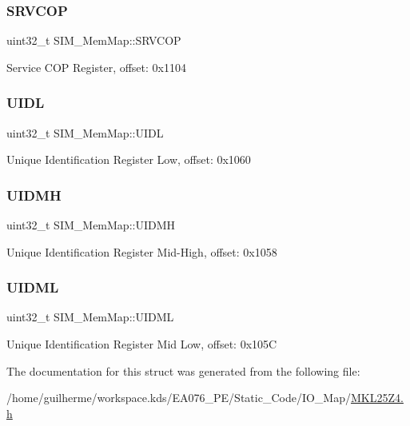 \subsubsection{\texorpdfstring{S\+R\+V\+C\+OP}{SRVCOP}}
{\footnotesize\ttfamily uint32\+\_\+t S\+I\+M\+\_\+\+Mem\+Map\+::\+S\+R\+V\+C\+OP}

Service C\+OP Register, offset\+: 0x1104 \mbox{\label{struct_s_i_m___mem_map_ac23a694afa8d84e55fc43ff0c0ec1b29}} 
\subsubsection{\texorpdfstring{U\+I\+DL}{UIDL}}
{\footnotesize\ttfamily uint32\+\_\+t S\+I\+M\+\_\+\+Mem\+Map\+::\+U\+I\+DL}

Unique Identification Register Low, offset\+: 0x1060 \mbox{\label{struct_s_i_m___mem_map_af4fb6d5bc3fa71f9c905570d87a2e93f}} 
\subsubsection{\texorpdfstring{U\+I\+D\+MH}{UIDMH}}
{\footnotesize\ttfamily uint32\+\_\+t S\+I\+M\+\_\+\+Mem\+Map\+::\+U\+I\+D\+MH}

Unique Identification Register Mid-\/\+High, offset\+: 0x1058 \mbox{\label{struct_s_i_m___mem_map_a51e871d8ac13db8b605b6ec1b3292be4}} 
\subsubsection{\texorpdfstring{U\+I\+D\+ML}{UIDML}}
{\footnotesize\ttfamily uint32\+\_\+t S\+I\+M\+\_\+\+Mem\+Map\+::\+U\+I\+D\+ML}

Unique Identification Register Mid Low, offset\+: 0x105C 

The documentation for this struct was generated from the following file\+:\begin{DoxyCompactItemize}
\item 
/home/guilherme/workspace.\+kds/\+E\+A076\+\_\+\+P\+E/\+Static\+\_\+\+Code/\+I\+O\+\_\+\+Map/\hyperlink{_m_k_l25_z4_8h}{M\+K\+L25\+Z4.\+h}\end{DoxyCompactItemize}
